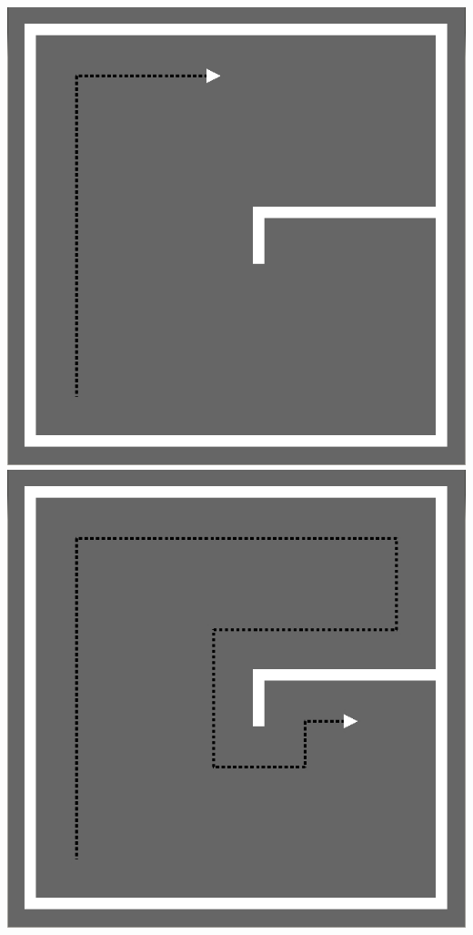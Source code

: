 \includegraphics[width=.49\linewidth]{./wall1}
\includegraphics[width=.49\linewidth]{./wall2}













